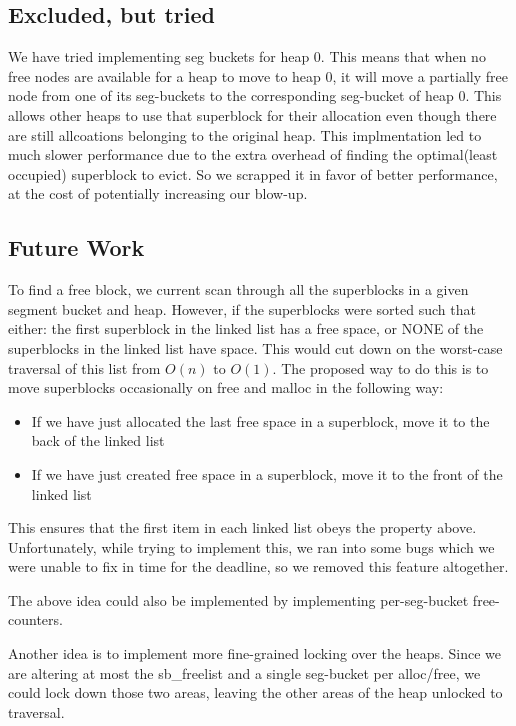 \documentclass[a4paper, 12pt]{article}
\begin{document}
\subsection{Excluded, but tried}

We have tried implementing seg buckets for heap 0. This means that when no free nodes are available for a heap to move to heap 0, it will move a partially free node from one of its seg-buckets to the corresponding seg-bucket of heap 0. This allows other heaps to use that superblock for their allocation even though there are still allcoations belonging to the original heap. This implmentation led to much slower performance due to the extra overhead of finding the optimal(least occupied) superblock to evict. So we scrapped it in favor of better performance, at the cost of potentially increasing our blow-up.

\subsection{Future Work}

To find a free block, we current scan through all the superblocks in a given segment bucket and heap. However, if the superblocks were sorted such that either: the first superblock in the linked list has a free space, or NONE of the superblocks in the linked list have space. This would cut down on the worst-case traversal of this list from $O(n)$ to $O(1)$. The proposed way to do this is to move superblocks occasionally on free and malloc in the following way:

\begin{itemize}
	\item If we have just allocated the last free space in a superblock, move it to the back of the linked list
	\item If we have just created free space in a superblock, move it to the front of the linked list
\end{itemize}

This ensures that the first item in each linked list obeys the property above. Unfortunately, while trying to implement this, we ran into some bugs which we were unable to fix in time for the deadline, so we removed this feature altogether.

The above idea could also be implemented by implementing per-seg-bucket free-counters.

Another idea is to implement more fine-grained locking over the heaps. Since we are altering at most the sb\_freelist and a single seg-bucket per alloc/free, we could lock down those two areas, leaving the other areas of the heap unlocked to traversal.
\end{document}
